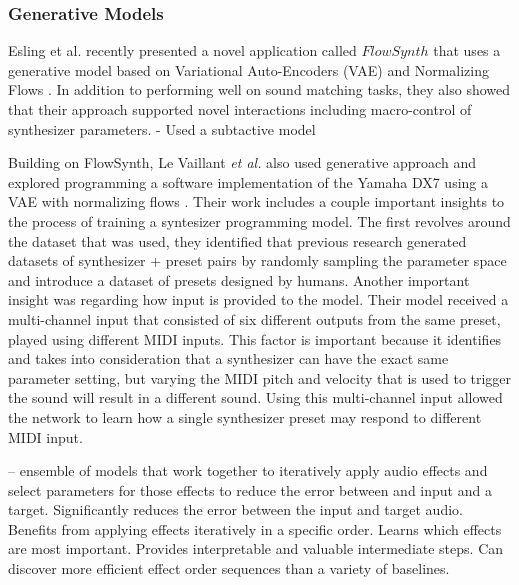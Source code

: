 \subsubsection{Generative Models}
Esling et al. recently presented a novel application called $FlowSynth$ that uses a generative model based on Variational Auto-Encoders (VAE) and Normalizing Flows \cite{esling2020flow}. In addition to performing well on sound matching tasks, they also showed that their approach supported novel interactions including macro-control of synthesizer parameters. 
- Used a subtactive model 

Building on FlowSynth, Le Vaillant \textit{et al.} also used generative approach and explored programming a software implementation of the Yamaha DX7 using a VAE with normalizing flows \cite{le2021improving}. Their work includes a couple important insights to the process of training a syntesizer programming model. The first revolves around the dataset that was used, they identified that previous research generated datasets of synthesizer + preset pairs by randomly sampling the parameter space and introduce a dataset of presets designed by humans. Another important insight was regarding how input is provided to the model. Their model received a multi-channel input that consisted of six different outputs from the same preset, played using different MIDI inputs. This factor is important because it identifies and takes into consideration that a synthesizer can have the exact same parameter setting, but varying the MIDI pitch and velocity that is used to trigger the sound will result in a different sound. Using this multi-channel input allowed the network to learn how a single synthesizer preset may respond to different MIDI input.

\cite{mitcheltree2021serumrnn} -- ensemble of models that work together to iteratively apply audio effects and select parameters for those effects to reduce the error between and input and a target. Significantly reduces the error between the input and target audio. Benefits from applying effects iteratively in a specific order. Learns which effects are most important. Provides interpretable and valuable intermediate steps. Can discover more efficient effect order sequences than a variety of baselines.

